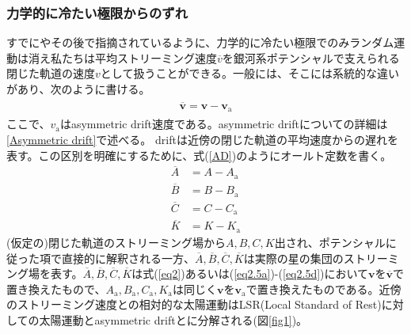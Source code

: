 \subsubsection{力学的に冷たい極限からのずれ}
すでに\cite{Oort1928}やその後\cite{KT1994}で指摘されているように、力学的に冷たい極限でのみランダム運動は消え私たちは平均ストリーミング速度$\overline{v}$を銀河系ポテンシャルで支えられる閉じた軌道の速度$v$として扱うことができる。一般には、そこには系統的な違いがあり、次のように書ける。
\begin{align}
\begin{aligned}
    \overline{\pmb{v}} = \pmb{v} - \pmb{v}_{\mathrm{a}}
\end{aligned} \label{AD}
\end{align}
ここで、$v_{\mathrm{a}}$はasymmetric drift速度である。asymmetric driftについての詳細は\ref{Asymmetric drift}で述べる。 driftは近傍の閉じた軌道の平均速度からの遅れを表す。この区別を明確にするために、式(\ref{AD})のようにオールト定数を書く。
\begin{subequations}
\begin{align}
	\overline{A} &= A - A_{\mathrm{a}} \\
	\overline{B} &= B - B_{\mathrm{a}} \\
	\overline{C} &= C - C_{\mathrm{a}} \\
	\overline{K} &= K - K_{\mathrm{a}}
\end{align}
\end{subequations}
(仮定の)閉じた軌道のストリーミング場から$A,B,C,K$出され、ポテンシャルに従った項で直接的に解釈される一方、$\overline{A},\overline{B},\overline{C},\overline{K}$は実際の星の集団のストリーミング場を表す。$\overline{A},\overline{B},\overline{C},\overline{K}$は式(\ref{eq2})あるいは(\ref{eq2.5a})-(\ref{eq2.5d})において$\pmb{v}$を$\pmb{\overline{v}}$で置き換えたもので、$A_{\mathrm{a}},B_{\mathrm{a}},C_{\mathrm{a}},K_{\mathrm{a}}$は同じく$\pmb{v}$を$\pmb{v}_{\mathrm{a}}$で置き換えたものである。近傍のストリーミング速度との相対的な太陽運動はLSR(Local Standard of Rest)に対しての太陽運動とasymmetric driftとに分解される(図\ref{fig1})。

